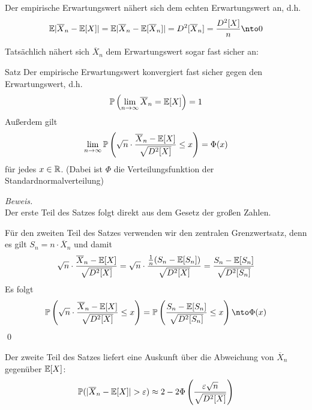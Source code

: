 Der empirische Erwartungswert nähert sich dem echten Erwartungswert an, d.h. 
\[
    \E|\overline{X}_n-\E[X]| = \E|\overline{X}_n-\E[\overline{X}_n]| = D^2[\overline{X}_n] = \dfrac{D^2[X]}{n} \nto 0
\]

Tatsächlich nähert sich $\overline{X}_n$ dem Erwartungswert sogar fast sicher an:

\begin{colbox}{Satz}\label{satz:conFSempE}
    Der empirische Erwartungswert konvergiert fast sicher gegen den Erwartungswert, d.h.
    \[
        \mathbb P\left(\lim_{n\to\infty}\overline{X}_n = \mathbb E[X]\right) = 1
    \]
    Außerdem gilt 
    \[
        \lim_{n\to\infty} \mathbb P\left(\sqrt{n}\cdot\dfrac{\overline{X}_n-\mathbb E[X]}{\sqrt{D^2[X]}}\leq x\right) = \Phi(x)
    \]
    für jedes $x\in\mathbb R$. (Dabei ist $\Phi$ die Verteilungsfunktion der Standardnormalverteilung)
\end{colbox}
\textit{Beweis.}\\
Der erste Teil des Satzes folgt direkt aus dem Gesetz der großen Zahlen. 

Für den zweiten Teil des Satzes verwenden wir den zentralen Grenzwertsatz, denn es gilt $S_n=n\cdot \overline{X}_n$
und damit
\[
    \sqrt{n}\cdot\dfrac{\overline{X}_n-\mathbb E[X]}{\sqrt{D^2[X]}}
    = \sqrt{n}\cdot\dfrac{\tfrac{1}{n}(S_n-\mathbb E[S_n])}{\sqrt{D^2[X]}}
    = \dfrac{S_n-\mathbb E[S_n]}{\sqrt{D^2[S_n]}}
\]
Es folgt
\[
    \P\left(\sqrt{n}\cdot\dfrac{\overline{X}_n-\E[X]}{\sqrt{D^2[X]}}\leq x\right) 
    = \P\left(\dfrac{S_n-\E[S_n]}{\sqrt{D^2[S_n]}}\leq x\right)
    \nto \Phi(x)
\]
\qed

Der zweite Teil des Satzes liefert eine Auskunft über die Abweichung von $\overline{X}_n$ gegenüber $\mathbb E[X]$:
\[
    \P(|\overline{X}_n-\E[X]|>\varepsilon) \approx 2-2\Phi\left(\dfrac{\varepsilon \sqrt{n}}{\sqrt{D^2[X]}}\right)
\]


